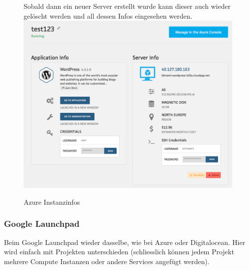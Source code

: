 \begin{figure}[!htbp]
Sobald dann ein neuer Server erstellt wurde kann dieser auch wieder gelöscht 
werden und all dessen Infos eingesehen werden.\\
\includegraphics[width=\textwidth]{./03_Analyse/03_Bitnami/images/azure_instanceinfos}
\caption{Azure Instanzinfos}
\end{figure}

\newpage

\subsubsection{Google Launchpad\autocite{google}}

Beim Google Launchpad wieder dasselbe, wie bei Azure oder Digitalocean.
Hier wird einfach mit Projekten unterschieden (schliesslich können jedem Projekt mehrere Compute Instanzen 
oder andere Services angefügt werden).

